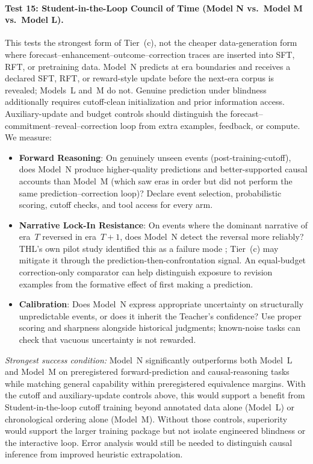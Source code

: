 \documentclass[11pt]{article}
\begin{document}
\paragraph{Test 15: Student-in-the-Loop Council of Time (Model N vs.\ Model M vs.\ Model L).}
This tests the strongest form of Tier~(c), not the cheaper data-generation form where forecast--enhancement--outcome--correction traces are inserted into SFT, RFT, or pretraining data. Model~N predicts at era boundaries and receives a declared SFT, RFT, or reward-style update before the next-era corpus is revealed; Models~L and~M do not. Genuine prediction under blindness additionally requires cutoff-clean initialization and prior information access. Auxiliary-update and budget controls should distinguish the forecast--commitment--reveal--correction loop from extra examples, feedback, or compute. We measure:
\begin{itemize}
    \item \textbf{Forward Reasoning}: On genuinely unseen events (post-training-cutoff), does Model~N produce higher-quality predictions and better-supported causal accounts than Model~M (which saw eras in order but did not perform the same prediction--correction loop)? Declare event selection, probabilistic scoring, cutoff checks, and tool access for every arm.
    \item \textbf{Narrative Lock-In Resistance}: On events where the dominant narrative of era~$T$ reversed in era~$T{+}1$, does Model~N detect the reversal more reliably? THL's own pilot study identified this as a failure mode \cite{westerberg2026thl}; Tier~(c) may mitigate it through the prediction-then-confrontation signal. An equal-budget correction-only comparator can help distinguish exposure to revision examples from the formative effect of first making a prediction.
    \item \textbf{Calibration}: Does Model~N express appropriate uncertainty on structurally unpredictable events, or does it inherit the Teacher's confidence? Use proper scoring and sharpness alongside historical judgments; known-noise tasks can check that vacuous uncertainty is not rewarded.
\end{itemize}
\emph{Strongest success condition:} Model~N significantly outperforms both
Model~L and Model~M on preregistered forward-prediction and causal-reasoning
tasks while matching general capability within preregistered equivalence margins. With the
cutoff and auxiliary-update controls above, this would support a benefit from
Student-in-the-loop cutoff training beyond annotated data alone (Model~L) or
chronological ordering alone (Model~M). Without those controls, superiority
would support the larger training package but not isolate engineered blindness
or the interactive loop. Error analysis would still be needed to distinguish
causal inference from improved heuristic extrapolation.
\end{document}
